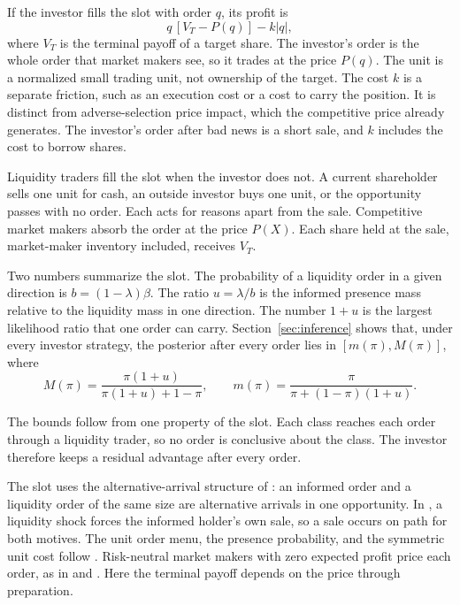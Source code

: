 If the investor fills the slot with order \(q\), its profit is
\begin{equation}\label{eq:profit}
q\,[V_T-P(q)]-k|q|,
\end{equation}
where \(V_T\) is the terminal payoff of a target share. The investor's order is the whole order that market
makers see, so it trades at the price \(P(q)\). The unit is a normalized small trading unit, not ownership of
the target. The cost \(k\) is a separate friction, such as an execution cost or a cost to carry the position. It is
distinct from adverse-selection price impact, which the competitive price already generates. The investor's
order after bad news is a short sale, and \(k\) includes the cost to borrow shares.

Liquidity traders fill the slot when the investor does not. A current shareholder sells one unit for cash, an
outside investor buys one unit, or the opportunity passes with no order. Each acts for reasons apart from the
sale. Competitive market makers absorb the order at the price \(P(X)\). Each share held at the sale,
market-maker inventory included, receives \(V_T\).

Two numbers summarize the slot. The probability of a liquidity order in a given direction is
\(b=(1-\lambda)\beta\). The ratio \(u=\lambda/b\) is the informed presence mass relative to the liquidity mass in
one direction. The number \(1+u\) is the largest likelihood ratio that one order can carry. Section~\ref{sec:inference} shows that,
under every investor strategy, the posterior after every order lies in \([m(\pi),M(\pi)]\), where
\begin{equation}\label{eq:bounds}
M(\pi)=\frac{\pi(1+u)}{\pi(1+u)+1-\pi},\qquad
m(\pi)=\frac{\pi}{\pi+(1-\pi)(1+u)}.
\end{equation}

The bounds follow from one property of the slot. Each class reaches each order through a liquidity trader, so
no order is conclusive about the class. The investor therefore keeps a residual advantage after every order.

The slot uses the alternative-arrival structure of \citet{DowGorton1997}: an informed order and a liquidity
order of the same size are alternative arrivals in one opportunity. In \citet{AdmatiPfleiderer2009}, a
liquidity shock forces the informed holder's own sale, so a sale occurs on path for both motives. The unit order
menu, the presence probability, and the symmetric unit cost follow \citet{EdmansGoldsteinJiang2015}.
Risk-neutral market makers with zero expected profit price each order, as in \citet{GlostenMilgrom1985} and
\citet{Kyle1985}. Here the terminal payoff depends on the price through preparation.

